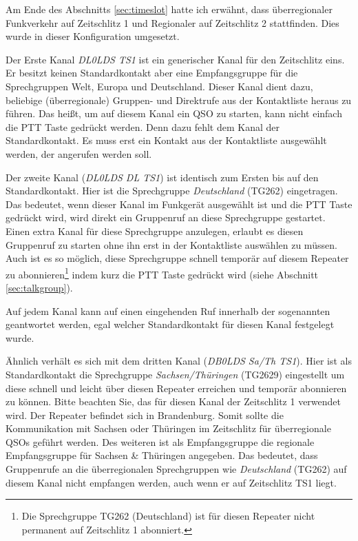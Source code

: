 Am Ende des Abschnitts \ref{sec:timeslot} hatte ich erwähnt, dass überregionaler Funkverkehr auf Zeitschlitz 1 und Regionaler auf Zeitschlitz 2 stattfinden. Dies wurde in dieser Konfiguration umgesetzt. 

Der Erste Kanal \emph{DL0LDS TS1} ist ein generischer Kanal für den Zeitschlitz eins. Er besitzt keinen Standardkontakt aber eine Empfangsgruppe für die Sprechgruppen Welt, Europa und Deutschland. Dieser Kanal dient dazu, beliebige (überregionale) Gruppen- und Direktrufe aus der Kontaktliste heraus zu führen. Das heißt, um auf diesem Kanal ein QSO zu starten, kann nicht einfach die PTT Taste gedrückt werden. Denn dazu fehlt dem Kanal der Standardkontakt. Es muss erst ein Kontakt aus der Kontaktliste ausgewählt werden, der angerufen werden soll. 

Der zweite Kanal (\emph{DL0LDS DL TS1}) ist identisch zum Ersten bis auf den Standardkontakt. Hier ist die Sprechgruppe \emph{Deutschland} (TG262) eingetragen. Das bedeutet, wenn dieser Kanal im Funkgerät ausgewählt ist und die PTT Taste gedrückt wird, wird direkt ein Gruppenruf an diese Sprechgruppe gestartet. Einen extra Kanal für diese Sprechgruppe anzulegen, erlaubt es diesen Gruppenruf zu starten ohne ihn erst in der Kontaktliste auswählen zu müssen. Auch ist es so möglich, diese Sprechgruppe schnell temporär auf diesem Repeater zu abonnieren\footnote{Die Sprechgruppe TG262 (Deutschland) ist für diesen Repeater nicht permanent auf Zeitschlitz 1 abonniert.} indem kurz die PTT Taste gedrückt wird (siehe Abschnitt \ref{sec:talkgroup}).

\begin{merke}
 Auf jedem Kanal kann auf einen eingehenden Ruf innerhalb der sogenannten  geantwortet werden, egal welcher Standardkontakt für diesen Kanal festgelegt wurde. 
\end{merke} 

Ähnlich verhält es sich mit dem dritten Kanal (\emph{DB0LDS Sa/Th TS1}). Hier ist als Standardkontakt die Sprechgruppe \emph{Sachsen/Thüringen} (TG2629) eingestellt um diese schnell und leicht über diesen Repeater erreichen und temporär abonnieren zu können. Bitte beachten Sie, das für diesen Kanal der Zeitschlitz 1 verwendet wird. Der Repeater befindet sich in Brandenburg. Somit sollte die Kommunikation mit Sachsen oder Thüringen im Zeitschlitz für überregionale QSOs geführt werden. Des weiteren ist als Empfangsgruppe die regionale Empfangsgruppe für Sachsen \& Thüringen angegeben. Das bedeutet, dass Gruppenrufe an die überregionalen Sprechgruppen wie \emph{Deutschland} (TG262) auf diesem Kanal nicht empfangen werden, auch wenn er auf Zeitschlitz TS1 liegt.


